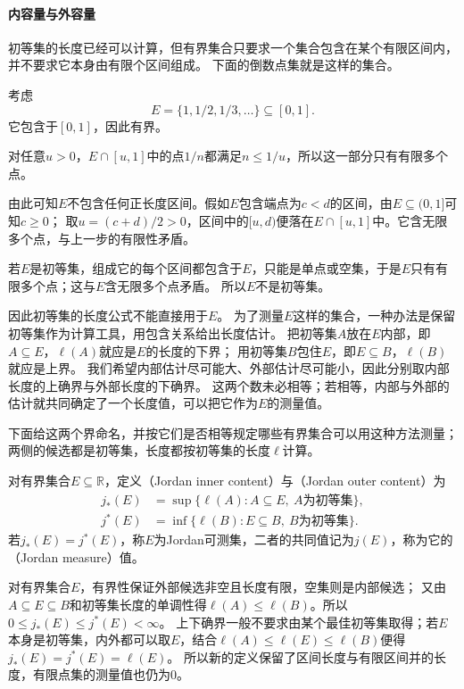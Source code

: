 \paragraph{内容量与外容量}

初等集的长度已经可以计算，但有界集合只要求一个集合包含在某个有限区间内，并不要求它本身由有限个区间组成。
下面的倒数点集就是这样的集合。
\begin{example}[倒数点集不是初等集]
\label{ex:set-measure-reciprocal-not-elementary}
考虑
\[
 E=\{1,1/2,1/3,\ldots\}\subseteq[0,1].
\]
它包含于$[0,1]$，因此有界。

对任意$u>0$，$E\cap[u,1]$中的点$1/n$都满足$n\leq1/u$，所以这一部分只有有限多个点。

由此可知$E$不包含任何正长度区间。假如$E$包含端点为$c<d$的区间，由$E\subseteq(0,1]$可知$c\geq0$；
取$u=(c+d)/2>0$，区间中的$[u,d)$便落在$E\cap[u,1]$中。它含无限多个点，与上一步的有限性矛盾。

若$E$是初等集，组成它的每个区间都包含于$E$，只能是单点或空集，于是$E$只有有限多个点；这与$E$含无限多个点矛盾。
所以$E$不是初等集。
\end{example}

因此初等集的长度公式不能直接用于$E$。
为了测量$E$这样的集合，一种办法是保留初等集作为计算工具，用包含关系给出长度估计。
把初等集$A$放在$E$内部，即$A\subseteq E$，$\ell(A)$就应是$E$的长度的下界；
用初等集$B$包住$E$，即$E\subseteq B$，$\ell(B)$就应是上界。
我们希望内部估计尽可能大、外部估计尽可能小，因此分别取内部长度的上确界与外部长度的下确界。
这两个数未必相等；若相等，内部与外部的估计就共同确定了一个长度值，可以把它作为$E$的测量值。

下面给这两个界命名，并按它们是否相等规定哪些有界集合可以用这种方法测量；两侧的候选都是初等集，长度都按初等集的长度$\ell$计算。
\begin{definition}[Jordan内容量与外容量]
\label{def:analysis-jordan-content}
对有界集合$E\subseteq\mathbb R$，定义（Jordan inner content）与（Jordan outer content）为
\[
 \begin{aligned}
 j_*(E)&=\sup\{\ell(A):A\subseteq E,\ A\text{为初等集}\},\\
 j^*(E)&=\inf\{\ell(B):E\subseteq B,\ B\text{为初等集}\}.
 \end{aligned}
\]
若$j_*(E)=j^*(E)$，称$E$为Jordan可测集，二者的共同值记为$j(E)$，称为它的（Jordan measure）值。
\end{definition}

对有界集合$E$，有界性保证外部候选非空且长度有限，空集则是内部候选；
又由$A\subseteq E\subseteq B$和初等集长度的单调性得$\ell(A)\leq\ell(B)$。所以
$0\leq j_*(E)\leq j^*(E)<\infty$。
上下确界一般不要求由某个最佳初等集取得；若$E$本身是初等集，内外都可以取$E$，结合$\ell(A)\leq\ell(E)\leq\ell(B)$便得$j_*(E)=j^*(E)=\ell(E)$。
所以新的定义保留了区间长度与有限区间并的长度，有限点集的测量值也仍为$0$。

